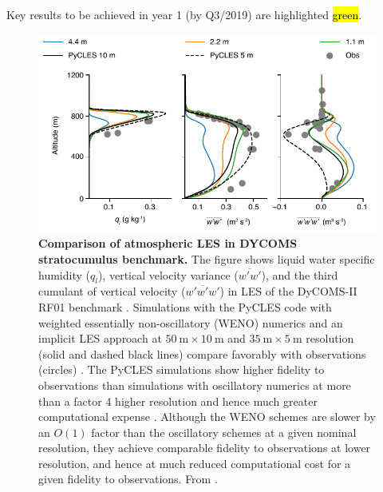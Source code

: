 \documentclass{article}
\newcommand{\hlg}[1]{{\sethlcolor{green}\hl{#1}}}
\begin{document}
Key results to be achieved in year 1 (by Q3/2019) are highlighted \hlg{green}.
\begin{figure}[htb]
     \centerline{\includegraphics[width=\textwidth]{DYCOMS-test.pdf}}
      \caption{\textbf{Comparison of atmospheric LES in DYCOMS stratocumulus benchmark.} The figure shows liquid water specific humidity ($q_l$), vertical velocity variance ($\overline{w'w'}$), and the third cumulant of vertical velocity ($\overline{w'w'w'}$) in LES of the DyCOMS-II RF01 benchmark \citep{Stevens03,Stevens05a}. Simulations with the PyCLES code with weighted essentially non-oscillatory (WENO) numerics and an implicit LES approach at $50~\mathrm{m} \times 10~\mathrm{m}$ and $35~\mathrm{m} \times 5~\mathrm{m}$ resolution (solid and dashed black lines) compare favorably with observations (circles) \citep{Pressel15a,Pressel17a}. The PyCLES simulations show higher fidelity to observations than simulations with oscillatory numerics at more than a factor 4 higher resolution and hence much greater computational expense \citep{Mellado18a}. Although the WENO schemes are slower by an $O(1)$ factor than the oscillatory schemes at a given nominal resolution, they achieve comparable fidelity to observations at lower resolution, and hence at much reduced computational cost for a given fidelity to observations. From \citet{Schneider18a}.}\label{f:DYCOMS-test}
    \end{figure}
    
\end{document}

